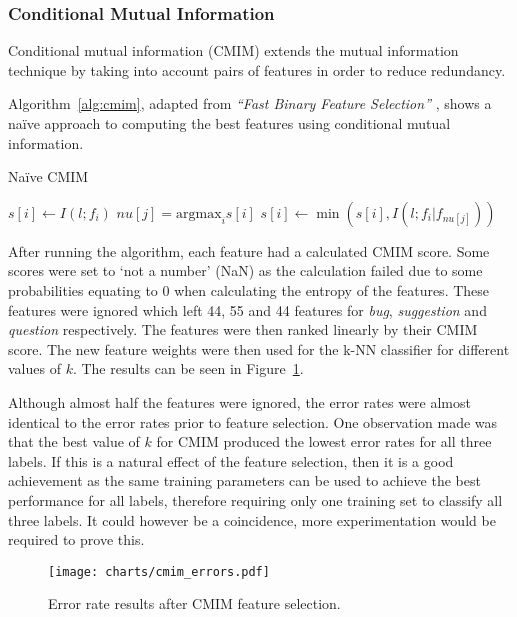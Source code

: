 \subsubsection{Conditional Mutual Information}
\label{sec:cmim}
Conditional mutual information (CMIM) extends the mutual information technique by taking into account pairs of features in order
to reduce redundancy.

Algorithm~\ref{alg:cmim}, adapted from \emph{``Fast Binary Feature Selection''} \cite{fast_binary_feature_selection}, shows a
na\"{i}ve approach to computing the best features using conditional mutual information.

\begin{algorithm}
    \caption{Na\"{i}ve CMIM}
    \label{alg:cmim}
    \begin{algorithmic}
            \STATE $s[i] \gets I(l;f_i)$
        \ENDFOR
            \STATE $nu[j] = \mathrm{argmax}_i s[i]$
                \STATE $s[i] \gets \min(s[i], I(l;f_i | f_{nu[j]}))$
            \ENDFOR
        \ENDFOR
    \end{algorithmic}
\end{algorithm}

After running the algorithm, each feature had a calculated CMIM score. Some scores were set to `not a number' (NaN) as the
calculation failed due to some probabilities equating to 0 when calculating the entropy of the features. These features were
ignored which left 44, 55 and 44 features for \textit{bug}, \textit{suggestion} and \textit{question} respectively. The features
were then ranked linearly by their CMIM score. The new feature weights were then used for the k-NN classifier for different
values of $k$. The results can be seen in Figure~\ref{fig:cmim_errors}.

Although almost half the features were ignored, the error rates were almost identical to the error rates prior to feature
selection. One observation made was that the best value of $k$ for CMIM produced the lowest error rates for all three labels.
If this is a natural effect of the feature selection, then it is a good achievement as the same training parameters can be used
to achieve the best performance for all labels, therefore requiring only one training set to classify all three labels. It could
however be a coincidence, more experimentation would be required to prove this.

\begin{figure}[h]
    \centering
    \texttt{[image: charts/cmim\_errors.pdf]}
    \caption{Error rate results after CMIM feature selection.}
    \label{fig:cmim_errors}
\end{figure}

